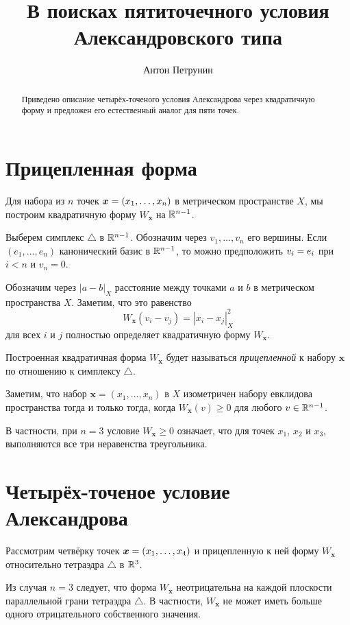 \documentclass{article}
\begin{document}
\title{В поисках пятиточечного условия\\ Александровского типа}
\author{Антон Петрунин}
\date{}
\maketitle
\begin{abstract}
Приведено описание четырёх-точеного условия Александрова через квадратичную форму и предложен его естественный аналог для пяти точек.
\end{abstract}

\section*{Прицепленная форма}

Для набора из $n$ точек $\bm{x}\z=(x_1,\dots,x_n)$ в метрическом пространстве $X$, мы построим квадратичную форму $W_{\bm{x}}$ на $\mathbb{R}^{n-1}$.

Выберем симплекс $\triangle$ в $\mathbb{R}^{n-1}$.
Обозначим через $v_1,\dots,v_n$ его вершины.
Если $(e_1,\dots,e_n)$ канонический базис в $\mathbb{R}^{n-1}$,
то можно предположить $v_i\z=e_i$ при $i<n$ и $v_n=0$.

Обозначим через $|a-b|_X$ расстояние между точками $a$ и $b$ в метрическом пространства $X$.
Заметим, что это равенство
\[W_{\bm{x}}(v_i-v_j)=|x_i-x_j|^2_X\] 
для всех $i$ и $j$ полностью определяет квадратичную форму $W_{\bm{x}}$.

Построенная квадратичная форма $W_{\bm{x}}$ будет называться \emph{прицепленной} к набору $\bm{x}$ по отношению к симплексу $\triangle$.

Заметим, что набор $\bm{x}=(x_1,\dots,x_n)$ в $X$ изометричен набору евклидова пространства тогда и только тогда, когда 
$W_{\bm{x}}(v)\ge 0$
для любого $v\in \mathbb{R}^{n-1}$.

В частности, при $n=3$ условие $W_{\bm{x}}\ge 0$ означает, что для точек $x_1$, $x_2$ и $x_3$,
выполняются все три неравенства треугольника. 

\section*{Четырёх-точеное условие Александрова}

Рассмотрим четвёрку точек $\bm{x}\z=(x_1,\dots,x_4)$ и прицепленную к ней форму $W_{\bm{x}}$ относительно тетраэдра $\triangle$ в $\mathbb{R}^3$.


Из случая $n=3$ 
следует, что форма $W_{\bm{x}}$ 
неотрицательна на каждой плоскости параллельной грани тетраэдра $\triangle$.
В частности, $W_{\bm{x}}$ не может иметь больше одного отрицательного собственного значения.
\end{document}
